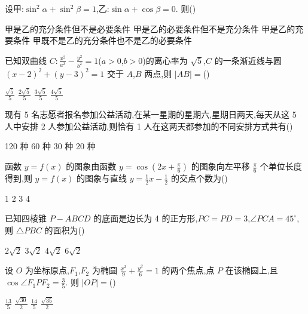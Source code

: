 \begin{problem}
设甲:\( \sin^2\alpha+\sin^2\beta=1 \),乙:\( \sin\alpha+\cos\beta=0 \). 则(\quad)

\choices
    {甲是乙的充分条件但不是必要条件}
    {甲是乙的必要条件但不是充分条件}
    {甲是乙的充要条件}
    {甲既不是乙的充分条件也不是乙的必要条件}
\end{problem}

\begin{problem}
已知双曲线 \( C:\frac{x^2}{a^2}-\frac{y^2}{b^2}=1 \)(\(a>0\),\(b>0\))的离心率为 \( \sqrt{5} \),\(C\) 的一条渐近线与圆 \( \left( x-2 \right)^2+\left( y-3 \right)^2=1 \) 交于 \(A\),\(B\) 两点,则 \( \lvert AB \rvert= \)(\quad)

\choices
    {\(\frac{\sqrt{5}}{5}\)}
    {\(\frac{2\sqrt{5}}{5}\)}
    {\(\frac{3\sqrt{5}}{5}\)}
    {\(\frac{4\sqrt{5}}{5}\)}
\end{problem}

\begin{problem}
现有 5 名志愿者报名参加公益活动,在某一星期的星期六,星期日两天,每天从这 5 人中安排 2 人参加公益活动,则恰有 1 人在这两天都参加的不同安排方式共有(\quad)

\choices
    {120 种}
    {60 种}
    {30 种}
    {20 种}
\end{problem}

\begin{problem}
函数 \( y=f(x) \) 的图象由函数 \( y=\cos\left( 2x+\frac{\pi}{6} \right) \) 的图象向左平移 \( \frac{\pi}{6} \) 个单位长度得到,则 \( y=f(x) \) 的图象与直线 \( y=\frac12x-\frac12 \) 的交点个数为(\quad)

\choices
    {1}
    {2}
    {3}
    {4}
\end{problem}

\begin{problem}
已知四棱锥 \( P-ABCD \) 的底面是边长为 4 的正方形,\( PC=PD=3 \),\( \angle PCA=45^\circ \),则 \( \triangle PBC \) 的面积为(\quad)

\choices
    {\(2\sqrt{2}\)}
    {\(3\sqrt{2}\)}
    {\(4\sqrt{2}\)}
    {\(6\sqrt{2}\)}
\end{problem}

\begin{problem}
设 \(O\) 为坐标原点,\(F_1\),\(F_2\) 为椭圆 \( \frac{x^2}{9}+\frac{y^2}{6}=1 \) 的两个焦点,点 \(P\) 在该椭圆上,且 \( \cos\angle F_1PF_2=\frac35 \). 则 \( \lvert OP \rvert= \)(\quad)

\choices
    {\(\frac{13}{5}\)}
    {\(\frac{\sqrt{30}}{2}\)}
    {\(\frac{14}{5}\)}
    {\(\frac{\sqrt{35}}{2}\)}
\end{problem}

